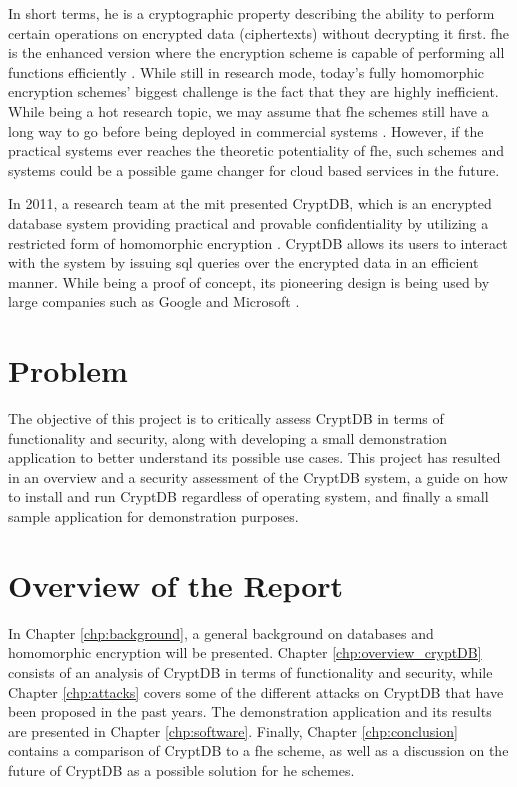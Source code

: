 In short terms, \gls{he} is a cryptographic property describing the ability to perform certain operations on encrypted data (ciphertexts) without decrypting it first. \gls{fhe} is the enhanced version where the encryption scheme is capable of performing all functions efficiently \cite{Gentry_thesis}. While still in research mode, today's fully homomorphic encryption schemes' biggest challenge is the fact that they are highly inefficient. While being a hot research topic, we may assume that \gls{fhe} schemes still have a long way to go before being deployed in commercial systems \cite{naehrig2011can}. However, if the practical systems ever reaches the theoretic potentiality of \gls{fhe}, such schemes and systems could be a possible game changer for cloud based services in the future.

In 2011, a research team at the \gls{mit} presented CryptDB, which is an encrypted database system providing practical and provable confidentiality by utilizing a restricted form of homomorphic encryption \cite{CryptDB_Main_Paper}. CryptDB allows its users to interact with the system by issuing \gls{sql} queries over the encrypted data in an efficient manner. While being a proof of concept, its pioneering design is being used by large companies such as Google and Microsoft \cite{cryptdb_homepage}.

\section{Problem}

The objective of this project is to critically assess CryptDB in terms of functionality and security, along with developing a small demonstration application to better understand its possible use cases. This project has resulted in an overview and a security assessment of the CryptDB system, a guide on how to install and run CryptDB regardless of operating system, and finally a small sample application for demonstration purposes.

\section{Overview of the Report}

In Chapter \ref{chp:background}, a general background on databases and homomorphic encryption will be presented. Chapter \ref{chp:overview_cryptDB} consists of an analysis of CryptDB in terms of functionality and security, while Chapter \ref{chp:attacks} covers some of the different attacks on CryptDB that have been proposed in the past years. The demonstration application and its results are presented in Chapter \ref{chp:software}. Finally, Chapter \ref{chp:conclusion} contains a comparison of CryptDB to a \gls{fhe} scheme, as well as a discussion on the future of CryptDB as a possible solution for \gls{he} schemes.